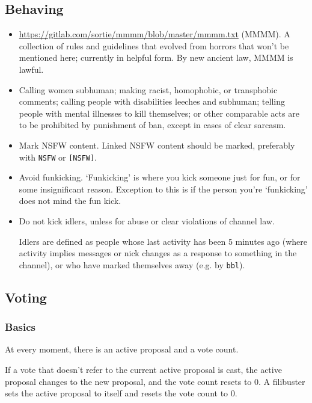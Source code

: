 \documentclass[11pt]{article}
\begin{document}
\subsection{Behaving}

\begin{itemize}
\item \url{https://gitlab.com/sortie/mmmm/blob/master/mmmm.txt} (MMMM).
A collection of rules and guidelines that evolved from horrors that won't be mentioned
here; currently in helpful form. By new ancient law, MMMM is lawful.

\item Calling women subhuman; making racist, homophobic, or transphobic
comments; calling people with disabilities leeches and subhuman;
telling people with mental illnesses to kill themselves; or other comparable acts
are to be prohibited by punishment of ban, except in cases of clear sarcasm.

\item Mark NSFW content. Linked NSFW content should be marked, preferably with
\texttt{NSFW} or \texttt{[NSFW]}.

\item Avoid funkicking.
`Funkicking' is where you kick someone just for fun, or for some insignificant reason.
Exception to this is if the person you're `funkicking' does not mind the fun kick.

\item Do not kick idlers, unless for abuse or clear violations of channel law.

Idlers are defined as people whose last activity has been 5 minutes ago (where activity
implies messages or nick changes as a response to something in the channel), or who
have marked themselves away (e.g. by \texttt{bbl}).
\end{itemize}


\subsection{Voting}


\subsubsection{Basics}

At every moment, there is an active proposal and a vote count.

If a vote that doesn't refer to the current active proposal is cast, the active proposal
changes to the new proposal, and the vote count resets to 0. A filibuster sets the active
proposal to itself and resets the vote count to 0.
\end{document}
